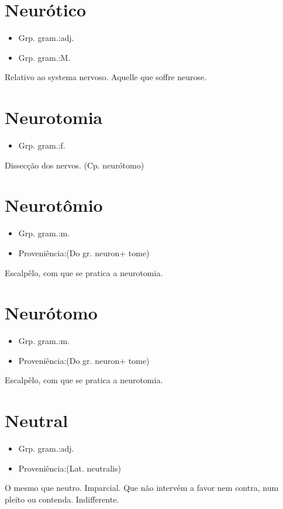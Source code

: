\section{Neurótico}
\begin{itemize}
\item {Grp. gram.:adj.}
\end{itemize}
\begin{itemize}
\item {Grp. gram.:M.}
\end{itemize}
Relativo ao systema nervoso.
Aquelle que soffre neurose.
\section{Neurotomia}
\begin{itemize}
\item {Grp. gram.:f.}
\end{itemize}
Dissecção dos nervos.
(Cp. \textunderscore neurótomo\textunderscore )
\section{Neurotômio}
\begin{itemize}
\item {Grp. gram.:m.}
\end{itemize}
\begin{itemize}
\item {Proveniência:(Do gr. \textunderscore neuron\textunderscore  + \textunderscore tome\textunderscore )}
\end{itemize}
Escalpêlo, com que se pratica a neurotomia.
\section{Neurótomo}
\begin{itemize}
\item {Grp. gram.:m.}
\end{itemize}
\begin{itemize}
\item {Proveniência:(Do gr. \textunderscore neuron\textunderscore  + \textunderscore tome\textunderscore )}
\end{itemize}
Escalpêlo, com que se pratica a neurotomia.
\section{Neutral}
\begin{itemize}
\item {Grp. gram.:adj.}
\end{itemize}
\begin{itemize}
\item {Proveniência:(Lat. \textunderscore neutralis\textunderscore )}
\end{itemize}
O mesmo que \textunderscore neutro\textunderscore .
Imparcial.
Que não intervém a favor nem contra, num pleito ou contenda.
Indifferente.

